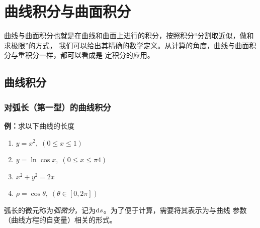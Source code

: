 \setcounter{chapter}{11}

\chapter{曲线积分与曲面积分}

曲线与曲面积分也就是在曲线和曲面上进行的积分，按照积分“分割取近似，做和求极限”的方式，
我们可以给出其精确的数学定义。从计算的角度，曲线与曲面积分与重积分一样，都可以看成是
定积分的应用。

\section{曲线积分}

\subsection{对弧长（第一型）的曲线积分}


{\bf 例：}求以下曲线的长度
\begin{enumerate}[(1)]
  \setlength{\itemindent}{1cm}
  \item $y=x^2,\;(0\leq x\leq 1)$
  \item $y=\ln\cos x,\;(0\leq x\leq\pi4)$
  \item $x^2+y^2=2x$
  \item $\rho=\cos\theta,\;(\theta\in[0,2\pi])$
\end{enumerate}

弧长的微元称为{\it 弧微分}，记为$\mathrm{d} s$。为了便于计算，需要将其表示为与曲线
参数（曲线方程的自变量）相关的形式。
	
\begin{center}
\end{center}

